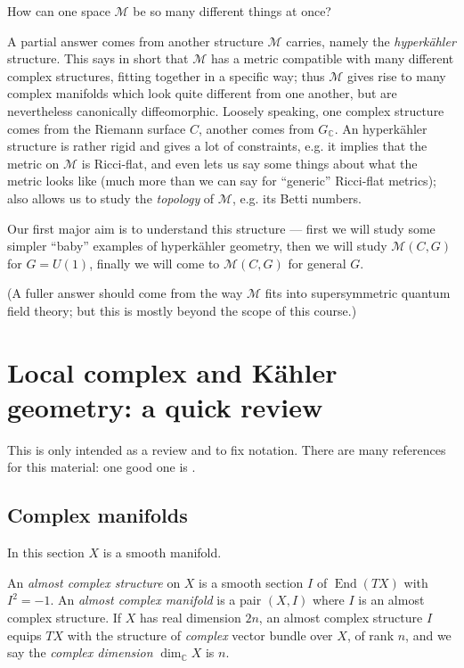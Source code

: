 \documentclass[12pt,letterpaper,reqno]{amsart}
\numberwithin{equation}{section}
\newcommand{\cM}{\ensuremath{\mathcal M}}
\newcommand{\C}{\ensuremath{\mathbb C}}
\newcommand{\kahler}{K\"ahler\xspace}
\newcommand{\hk}{hyperk\"ahler\xspace}
\newcommand{\ti}[1]{\textit{#1}}
\DeclareMathOperator{\End}{End}
\begin{document}
How can one space $\cM$ be so many different things at once?

A partial answer comes from another structure $\cM$ carries, namely
the \ti{\hk} structure. This says in short that $\cM$ has a 
metric compatible with many
different complex structures,
fitting together in a specific way; thus $\cM$ gives rise to
many complex manifolds which look quite different from one
another, but are nevertheless canonically diffeomorphic.
Loosely speaking, one complex structure comes from the Riemann 
surface $C$, another comes from $G_\C$.
An \hk structure is rather rigid and gives a lot of constraints, e.g.
it implies that the metric on $\cM$ is Ricci-flat, and even lets 
us say some things about what the metric looks like (much
more than we can say for ``generic'' Ricci-flat metrics);
also allows us to study the \ti{topology} of $\cM$, e.g. 
its Betti numbers.

Our first major aim is to understand this structure --- first 
we will study some simpler ``baby'' examples of \hk geometry, then
we will study $\cM(C,G)$ for $G = U(1)$, finally we will
come to $\cM(C,G)$ for general $G$.

(A fuller answer should come from the way $\cM$
fits into supersymmetric quantum field theory; but this is 
mostly beyond the scope of this course.)



\section{Local complex and \kahler geometry: a quick review}

This is only intended as a review and to fix notation.
There are many references for this material: one
good one is \cite{MR2093043}.


\subsection{Complex manifolds} 
In this section $X$ is a smooth manifold.

\begin{defn}
An \ti{almost complex structure} on $X$ is a smooth section $I$ of $\End(TX)$ with $I^2 = -1$. An \ti{almost complex manifold} is a pair $(X,I)$ where $I$ is an almost complex structure.
If $X$ has real dimension $2n$, an almost complex
structure $I$ equips $TX$ with the structure of
\ti{complex} vector bundle over $X$, of rank $n$,
and we say the \ti{complex dimension} $\dim_\C X$ is
$n$.
\end{defn}
\end{document}
